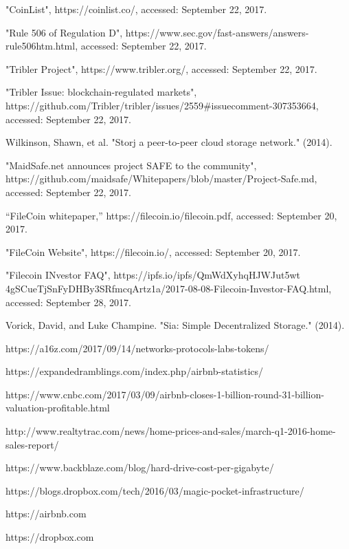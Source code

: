 \documentclass[journal]{IEEEtran}
\begin{document}
\begin{thebibliography}{1}
 "CoinList", https://coinlist.co/, accessed: September 22, 2017.

 "Rule 506 of Regulation D", https://www.sec.gov/fast-answers/answers-rule506htm.html, accessed: September 22, 2017.

 "Tribler Project", https://www.tribler.org/, accessed: September 22, 2017.

"Tribler Issue: blockchain-regulated markets", https://github.com/Tribler/tribler/issues/2559\#issuecomment-307353664, accessed: September 22, 2017.

 Wilkinson, Shawn, et al. "Storj a peer-to-peer cloud storage network." (2014).

 "MaidSafe.net announces project SAFE to the community", https://github.com/maidsafe/Whitepapers/blob/master/Project-Safe.md, accessed: September 22, 2017.

 “FileCoin
whitepaper,” https://filecoin.io/filecoin.pdf, accessed: September 20, 2017.

 "FileCoin Website", https://filecoin.io/, accessed: September 20, 2017.

 "Filecoin INvestor FAQ", https://ipfs.io/ipfs/QmWdXyhqHJWJut5wt\\4gSCueTjSnFyDHBy3SRfmcqArtz1a/2017-08-08-Filecoin-Investor-FAQ.html, accessed: September 28, 2017.

 Vorick, David, and Luke Champine. "Sia: Simple Decentralized Storage." (2014).

 https://a16z.com/2017/09/14/networks-protocols-labs-tokens/

 https://expandedramblings.com/index.php/airbnb-statistics/

 https://www.cnbc.com/2017/03/09/airbnb-closes-1-billion-round-31-billion-valuation-profitable.html

 http://www.realtytrac.com/news/home-prices-and-sales/march-q1-2016-home-sales-report/

 https://www.backblaze.com/blog/hard-drive-cost-per-gigabyte/

 https://blogs.dropbox.com/tech/2016/03/magic-pocket-infrastructure/

 https://airbnb.com

 https://dropbox.com


\end{thebibliography}
\end{document}
